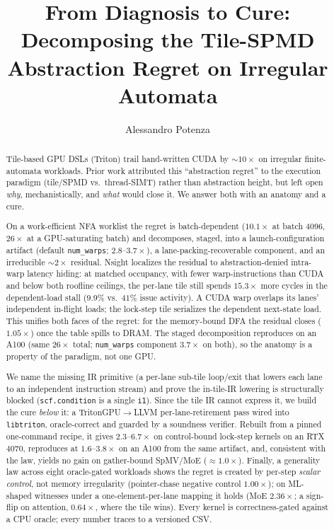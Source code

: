 \documentclass[sigplan,10pt]{acmart}
\begin{document}
\title{From Diagnosis to Cure: Decomposing the Tile-SPMD Abstraction Regret on Irregular Automata}
\author{Alessandro Potenza}
\renewcommand{\shortauthors}{Potenza}

\begin{abstract}
Tile-based GPU DSLs (Triton) trail hand-written CUDA by ${\sim}10\times$ on irregular finite-automata
workloads. Prior work attributed this ``abstraction regret'' to the execution paradigm (tile/SPMD vs.\
thread-SIMT) rather than abstraction height, but left open \emph{why}, mechanistically, and \emph{what}
would close it. We answer both with an anatomy and a cure.

On a work-efficient NFA worklist the regret is batch-dependent ($10.1\times$ at batch 4096, $26\times$
at a GPU-saturating batch) and decomposes, staged, into a launch-configuration artifact (default
\texttt{num\_warps}; $2.8$--$3.7\times$), a lane-packing-recoverable component, and an irreducible
${\sim}2\times$ residual. Nsight localizes the residual to abstraction-denied intra-warp latency
hiding: at matched occupancy, with fewer warp-instructions than CUDA and below both roofline ceilings,
the per-lane tile still spends $15.3\times$ more cycles in the dependent-load stall ($9.9\%$ vs.\ $41\%$
issue activity). A CUDA warp overlaps its lanes' independent in-flight loads; the lock-step tile
serializes the dependent next-state load. This unifies both faces of the regret: for the memory-bound
DFA the residual closes ($1.05\times$) once the table spills to DRAM. The staged decomposition
reproduces on an A100 (same $26\times$ total; \texttt{num\_warps} component $3.7\times$ on both), so the
anatomy is a property of the paradigm, not one GPU.

We name the missing IR primitive (a per-lane sub-tile loop/exit that lowers each lane to an independent
instruction stream) and prove the in-tile-IR lowering is structurally blocked (\texttt{scf.condition}
is a single \texttt{i1}). Since the tile IR cannot express it, we build the cure \emph{below} it: a
\mbox{TritonGPU$\rightarrow$LLVM} per-lane-retirement pass wired into \texttt{libtriton}, oracle-correct
and guarded by a soundness verifier. Rebuilt from a pinned one-command recipe, it gives
$2.3$--$6.7\times$ on control-bound lock-step kernels on an RTX 4070, reproduces at $1.6$--$3.8\times$
on an A100 from the same artifact, and, consistent with the law, yields no gain on gather-bound
SpMV/MoE (${\approx}1.0\times$). Finally, a generality law across eight oracle-gated
workloads shows the regret is created by per-step \emph{scalar control}, not memory irregularity
(pointer-chase negative control $1.00\times$); on ML-shaped witnesses under a one-element-per-lane
mapping it holds (MoE $2.36\times$; a sign-flip on attention, $0.64\times$, where the tile wins).
Every kernel is correctness-gated against a CPU oracle; every number traces to a versioned CSV.
\end{abstract}
\end{document}
